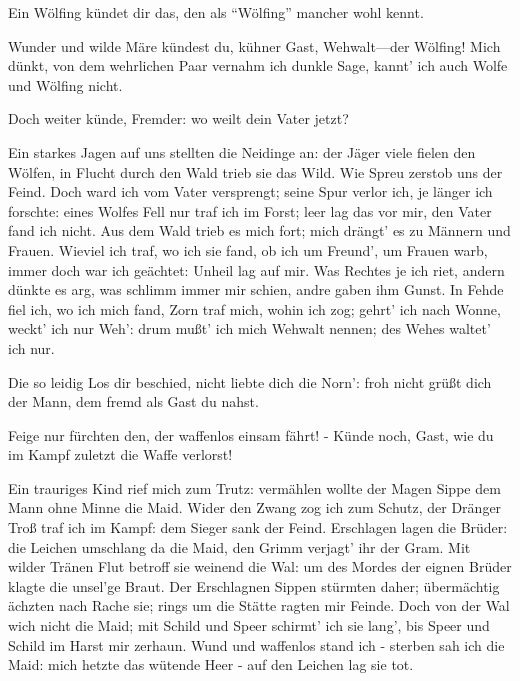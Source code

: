 \begin{drama}

Ein Wölfing kündet dir das,
den als ``Wölfing'' mancher wohl kennt.
 

\Hundingspeaks
Wunder und wilde Märe kündest du, kühner Gast,
Wehwalt---der Wölfing!
Mich dünkt, von dem wehrlichen Paar
vernahm ich dunkle Sage,
kannt' ich auch Wolfe und Wölfing nicht.
 

\Sieglindespeaks
Doch weiter künde, Fremder:
wo weilt dein Vater jetzt?
 

\Siegmundspeaks
Ein starkes Jagen auf uns stellten die Neidinge an:
der Jäger viele fielen den Wölfen,
in Flucht durch den Wald
trieb sie das Wild.
Wie Spreu zerstob uns der Feind.
Doch ward ich vom Vater versprengt;
seine Spur verlor ich, je länger ich forschte:
eines Wolfes Fell nur
traf ich im Forst;
leer lag das vor mir, den Vater fand ich nicht.
Aus dem Wald trieb es mich fort;
mich drängt' es zu Männern und Frauen.
Wieviel ich traf, wo ich sie fand,
ob ich um Freund', um Frauen warb,
immer doch war ich geächtet:
Unheil lag auf mir.
Was Rechtes je ich riet, andern dünkte es arg,
was schlimm immer mir schien,
andre gaben ihm Gunst.
In Fehde fiel ich, wo ich mich fand,
Zorn traf mich, wohin ich zog;
gehrt' ich nach Wonne, weckt' ich nur Weh':
drum mußt' ich mich Wehwalt nennen;
des Wehes waltet' ich nur.
 




\Hundingspeaks
Die so leidig Los dir beschied,
nicht liebte dich die Norn':
froh nicht grüßt dich der Mann,
dem fremd als Gast du nahst.
 

\Sieglindespeaks
Feige nur fürchten den, der waffenlos einsam fährt! -
Künde noch, Gast,
wie du im Kampf zuletzt die Waffe verlorst!
 

\Siegmundspeaks


Ein trauriges Kind rief mich zum Trutz:
vermählen wollte der Magen Sippe
dem Mann ohne Minne die Maid.
Wider den Zwang zog ich zum Schutz,
der Dränger Troß traf ich im Kampf:
dem Sieger sank der Feind.
Erschlagen lagen die Brüder:
die Leichen umschlang da die Maid,
den Grimm verjagt' ihr der Gram.
Mit wilder Tränen Flut betroff sie weinend die Wal:
um des Mordes der eignen Brüder
klagte die unsel'ge Braut.
Der Erschlagnen Sippen stürmten daher;
übermächtig ächzten nach Rache sie;
rings um die Stätte ragten mir Feinde.
Doch von der Wal wich nicht die Maid;
mit Schild und Speer schirmt' ich sie lang',
bis Speer und Schild im Harst mir zerhaun.
Wund und waffenlos stand ich -
sterben sah ich die Maid:
mich hetzte das wütende Heer -
auf den Leichen lag sie tot.
 



\end{drama}
